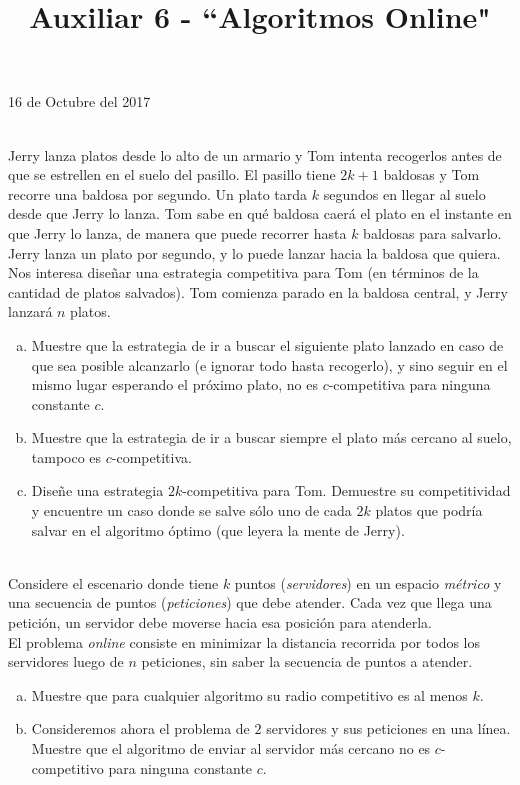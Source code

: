 \documentclass[dcc,uchile]{fcfmcourse}
\title{Auxiliar 6 - ``Algoritmos Online"}
\theoremstyle{plain}
\theoremstyle{definition}
\begin{document}
\maketitle
\begin{center}
16 de Octubre del 2017
\end{center}


\vspace{-1ex}


\begin{problems}
\\
Jerry lanza platos desde lo alto de un armario y Tom intenta recogerlos antes de que se estrellen en el suelo del pasillo. El pasillo tiene $2k + 1$ baldosas y Tom recorre una baldosa por segundo. Un plato tarda $k$ segundos en llegar al suelo desde que Jerry lo lanza. Tom sabe en qué baldosa caerá el plato en el instante
en que Jerry lo lanza, de manera que puede recorrer hasta $k$ baldosas para salvarlo. Jerry lanza un plato por segundo, y lo puede lanzar hacia la baldosa que quiera.
Nos interesa diseñar una estrategia competitiva para Tom (en términos de la cantidad de platos salvados). Tom comienza parado en la baldosa central, y Jerry lanzará $n$ platos.
\begin{enumerate}[a)]
    \item Muestre que la estrategia de ir a buscar el siguiente plato lanzado en caso de que sea posible alcanzarlo (e ignorar todo hasta recogerlo), y sino seguir en el mismo lugar esperando el próximo plato, no es $c$-competitiva para ninguna constante $c$.
    \item Muestre que la estrategia de ir a buscar siempre el plato más cercano al suelo, tampoco es $c$-competitiva.
    \item Diseñe una estrategia $2k$-competitiva para Tom. Demuestre su competitividad y encuentre un caso donde se salve sólo uno de cada $2k$ platos que podría salvar en el algoritmo óptimo (que leyera la mente de Jerry).
\end{enumerate}
\\
Considere el escenario donde tiene $k$ puntos (\textit{servidores}) en un espacio \textit{métrico} y una secuencia de puntos (\textit{peticiones}) que debe atender. Cada vez que llega una petición, un servidor debe moverse hacia esa posición para atenderla.\\
El problema \textit{online} consiste en minimizar la distancia recorrida por todos los servidores luego de $n$ peticiones, sin saber la secuencia de puntos a atender.
\begin{enumerate}[a)]
    \item Muestre que para cualquier algoritmo su radio competitivo es al menos $k$.   
    \item Consideremos ahora el problema de $2$ servidores y sus peticiones en una línea. Muestre que el algoritmo de enviar al servidor más cercano no es $c$-competitivo para ninguna constante $c$.
\end{enumerate}
\end{problems}
\end{document}
